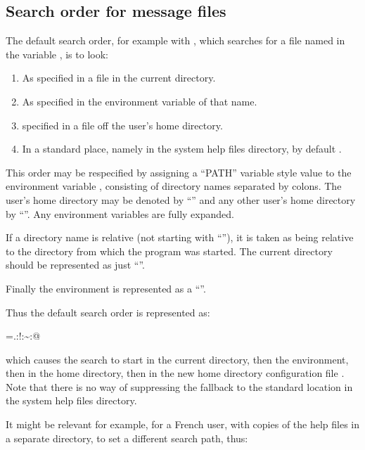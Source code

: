 \subsection{Search order for message files}
The default search order, for example with \PrBtq{}, which searches for a file named in the variable , is to look:

\begin{enumerate}
\item As specified in a \configurationfile{} file in the current directory.
\item As specified in the environment variable of that name. \item specified in a \homeconfigpath{} file off the user's home directory.
\item In a standard place, namely  in the system help files directory, by default \linebreak[4]\helpdir.
\end{enumerate}
This order may be respecified by assigning a ``PATH'' variable style value to the environment variable \helppathvar{}, consisting of
directory names separated by colons. The user's home directory may be denoted by ``\filename{\~{}}'' and any other
user's home directory by ``''. Any environment variables are fully expanded.

If a directory name is relative (not starting with ``\filename{/}''), it is taken as being relative to the directory from which the program was started.
The current directory should be represented as just ``''.

Finally the environment is represented as a ``\filename{!}''.

Thus the default search order is represented as:

\begin{expara}

\helppathvarname={\textquotedbl}.:!:\~{}:@{\textquotedbl}

\end{expara}

which causes the search to start in the current directory, then the
environment, then in the home directory, then in the new home directory configuration file \homeconfigpath.
Note that there is no way of suppressing the fallback to the standard location in the system help files directory.

It might be relevant for example, for a French user, with copies of the help files in a separate directory, to set a different search path,
thus:

